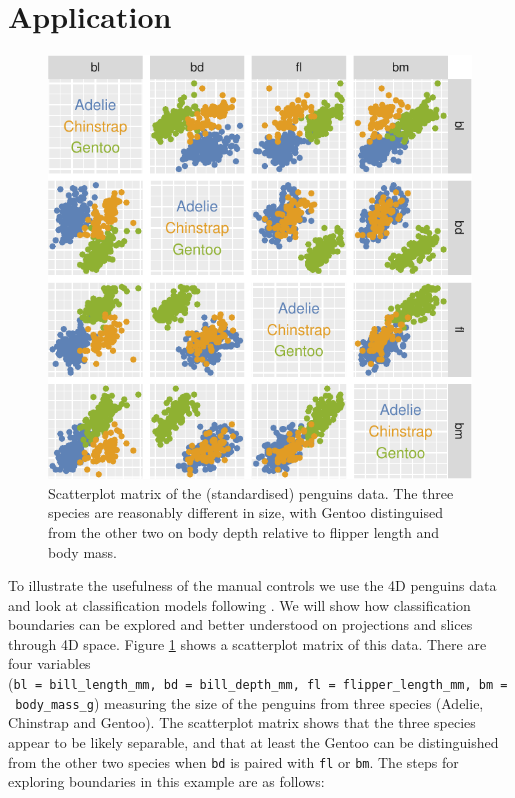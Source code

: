 \documentclass[]{interact}
\theoremstyle{plain}%
\theoremstyle{definition}
\theoremstyle{remark}
\begin{document}
\hypertarget{sec:examples}{%
\section{Application}\label{sec:examples}}

\begin{figure}

{\centering \includegraphics[width=0.6\linewidth]{paper_files/figure-latex/penguins-scatmat-1} 

}

\caption{Scatterplot matrix of the (standardised) penguins data. The three species are reasonably different in size, with Gentoo distinguised from the other two on body depth relative to flipper length and body mass.}\label{fig:penguins-scatmat}
\end{figure}

To illustrate the usefulness of the manual controls we use the 4D
penguins data \citep{penguins} and look at classification models
following \citet{sam11271}. We will show how classification boundaries
can be explored and better understood on projections and slices through
4D space. Figure \ref{fig:penguins-scatmat} shows a scatterplot matrix
of this data. There are four variables
(\texttt{bl\ =\ bill\_length\_mm,\ bd\ =\ bill\_depth\_mm,\ fl\ =\ flipper\_length\_mm,\ bm\ =\ body\_mass\_g})
measuring the size of the penguins from three species (Adelie, Chinstrap
and Gentoo). The scatterplot matrix shows that the three species appear
to be likely separable, and that at least the Gentoo can be
distinguished from the other two species when \texttt{bd} is paired with
\texttt{fl} or \texttt{bm}. The steps for exploring boundaries in this
example are as follows:
\end{document}
